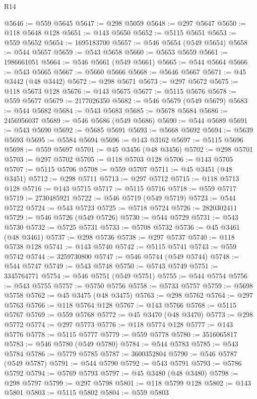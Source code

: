\begin{lexlean}{R14}
\begin{coremodule}
@5646 := @559 @5645
@5647 := @298 @5059
@5648 := @297 @5647
@5650 := @118 @5648 @128
@5651 := @143 @5650
@5652 := @5115 @5651
@5653 := @559 @5652
@5654 := 1695183700
@5657 := @546 @5654 (@549 @5654)
@5658 := @544 @5657
@5659 := @543 @5658
@5660 := @5653 @5659
@5661 := 1986661051
@5664 := @546 @5661 (@549 @5661)
@5665 := @544 @5664
@5666 := @543 @5665
@5667 := @5660 @5666
@5668 := @5646 @5667
@5671 := @45 @3442 (@48 @3442)
@5672 := @298 @5671
@5673 := @297 @5672
@5675 := @118 @5673 @128
@5676 := @143 @5675
@5677 := @5115 @5676
@5678 := @559 @5677
@5679 := 2177026350
@5682 := @546 @5679 (@549 @5679)
@5683 := @544 @5682
@5684 := @543 @5683
@5685 := @5678 @5684
@5686 := 2456956037
@5689 := @546 @5686 (@549 @5686)
@5690 := @544 @5689
@5691 := @543 @5690
@5692 := @5685 @5691
@5693 := @5668 @5692
@5694 := @5639 @5693
@5695 := @5584 @5694
@5696 := @143 @3162
@5697 := @5115 @5696
@5698 := @559 @5697
@5701 := @45 @3456 (@48 @3456)
@5702 := @298 @5701
@5703 := @297 @5702
@5705 := @118 @5703 @128
@5706 := @143 @5705
@5707 := @5115 @5706
@5708 := @559 @5707
@5711 := @45 @3451 (@48 @3451)
@5712 := @298 @5711
@5713 := @297 @5712
@5715 := @118 @5713 @128
@5716 := @143 @5715
@5717 := @5115 @5716
@5718 := @559 @5717
@5719 := 2730485921
@5722 := @546 @5719 (@549 @5719)
@5723 := @544 @5722
@5724 := @543 @5723
@5725 := @5718 @5724
@5726 := 2820302411
@5729 := @546 @5726 (@549 @5726)
@5730 := @544 @5729
@5731 := @543 @5730
@5732 := @5725 @5731
@5733 := @5708 @5732
@5736 := @45 @3461 (@48 @3461)
@5737 := @298 @5736
@5738 := @297 @5737
@5740 := @118 @5738 @128
@5741 := @143 @5740
@5742 := @5115 @5741
@5743 := @559 @5742
@5744 := 3259730800
@5747 := @546 @5744 (@549 @5744)
@5748 := @544 @5747
@5749 := @543 @5748
@5750 := @5743 @5749
@5751 := 3345764771
@5754 := @546 @5751 (@549 @5751)
@5755 := @544 @5754
@5756 := @543 @5755
@5757 := @5750 @5756
@5758 := @5733 @5757
@5759 := @5698 @5758
@5762 := @45 @3475 (@48 @3475)
@5763 := @298 @5762
@5764 := @297 @5763
@5766 := @118 @5764 @128
@5767 := @143 @5766
@5768 := @5115 @5767
@5769 := @559 @5768
@5772 := @45 @3470 (@48 @3470)
@5773 := @298 @5772
@5774 := @297 @5773
@5776 := @118 @5774 @128
@5777 := @143 @5776
@5778 := @5115 @5777
@5779 := @559 @5778
@5780 := 3516065817
@5783 := @546 @5780 (@549 @5780)
@5784 := @544 @5783
@5785 := @543 @5784
@5786 := @5779 @5785
@5787 := 3600352804
@5790 := @546 @5787 (@549 @5787)
@5791 := @544 @5790
@5792 := @543 @5791
@5793 := @5786 @5792
@5794 := @5769 @5793
@5797 := @45 @3480 (@48 @3480)
@5798 := @298 @5797
@5799 := @297 @5798
@5801 := @118 @5799 @128
@5802 := @143 @5801
@5803 := @5115 @5802
@5804 := @559 @5803

\end{coremodule}
\end{lexlean}
